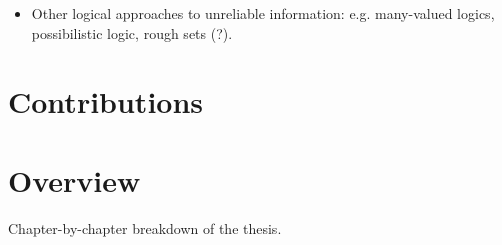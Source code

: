 \begin{notes}
    \begin{itemize}
        \item Other logical approaches to unreliable information: e.g.
              many-valued logics, possibilistic logic, rough sets (?).
    \end{itemize}
\end{notes}

\section{Contributions}


\section{Overview}

\begin{notes}
    Chapter-by-chapter breakdown of the thesis.
\end{notes}
